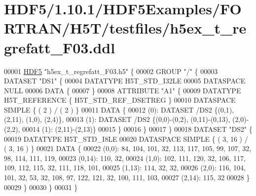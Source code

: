 \hypertarget{_h_d_f5_21_810_81_2_h_d_f5_examples_2_f_o_r_t_r_a_n_2_h5_t_2testfiles_2h5ex__t__regrefatt___f03_8ddl_source}{}\section{H\+D\+F5/1.10.1/\+H\+D\+F5\+Examples/\+F\+O\+R\+T\+R\+A\+N/\+H5\+T/testfiles/h5ex\+\_\+t\+\_\+regrefatt\+\_\+\+F03.ddl}
\label{_h_d_f5_21_810_81_2_h_d_f5_examples_2_f_o_r_t_r_a_n_2_h5_t_2testfiles_2h5ex__t__regrefatt___f03_8ddl_source}

\begin{DoxyCode}
00001 \hyperlink{namespace_h_d_f5}{HDF5} \textcolor{stringliteral}{"h5ex\_t\_regrefatt\_F03.h5"} \{
00002 GROUP \textcolor{stringliteral}{"/"} \{
00003    DATASET \textcolor{stringliteral}{"DS1"} \{
00004       DATATYPE  H5T\_STD\_I32LE
00005       DATASPACE  NULL
00006       DATA \{
00007       \}
00008       ATTRIBUTE \textcolor{stringliteral}{"A1"} \{
00009          DATATYPE  H5T\_REFERENCE \{ H5T\_STD\_REF\_DSETREG \}
00010          DATASPACE  SIMPLE \{ ( 2 ) / ( 2 ) \}
00011          DATA \{
00012          (0): DATASET /DS2 \{(0,1), (2,11), (1,0), (2,4)\},
00013          (1): DATASET /DS2 \{(0,0)-(0,2), (0,11)-(0,13), (2,0)-(2,2),
00014          (1):  (2,11)-(2,13)\}
00015          \}
00016       \}
00017    \}
00018    DATASET \textcolor{stringliteral}{"DS2"} \{
00019       DATATYPE  H5T\_STD\_I8LE
00020       DATASPACE  SIMPLE \{ ( 3, 16 ) / ( 3, 16 ) \}
00021       DATA \{
00022       (0,0): 84, 104, 101, 32, 113, 117, 105, 99, 107, 32, 98, 114, 111, 119,
00023       (0,14): 110, 32,
00024       (1,0): 102, 111, 120, 32, 106, 117, 109, 112, 115, 32, 111, 118, 101,
00025       (1,13): 114, 32, 32,
00026       (2,0): 116, 104, 101, 32, 53, 32, 108, 97, 122, 121, 32, 100, 111, 103,
00027       (2,14): 115, 32
00028       \}
00029    \}
00030 \}
00031 \}
\end{DoxyCode}
